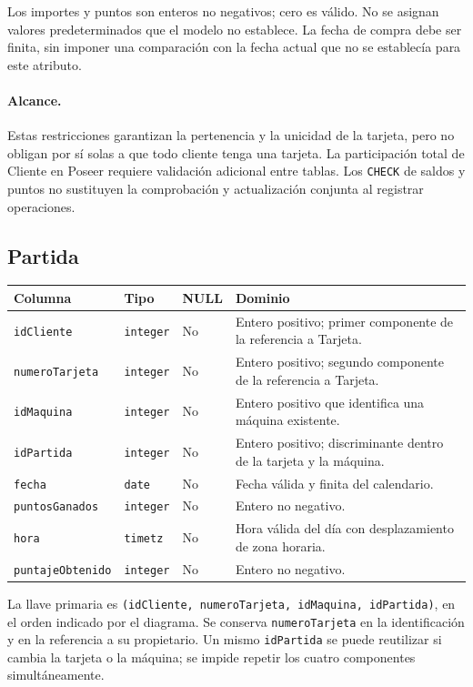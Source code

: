 Los importes y puntos son enteros no negativos; cero es válido. No se
asignan valores predeterminados que el modelo no establece. La fecha
de compra debe ser finita, sin imponer una comparación con la fecha
actual que no se establecía para este atributo.

\paragraph{Alcance.}
Estas restricciones garantizan la pertenencia y la unicidad de la tarjeta,
pero no obligan por sí solas a que todo cliente tenga una tarjeta.
La participación total de Cliente en Poseer requiere validación adicional
entre tablas. Los \texttt{CHECK} de saldos y puntos no sustituyen la
comprobación y actualización conjunta al registrar operaciones.

\clearpage
\subsection{Partida}

\noindent\begin{tabular}{@{}p{}p{}p{}p{}@{}}
\hline
\textbf{Columna} & \textbf{Tipo} & \textbf{NULL} & \textbf{Dominio} \\
\hline
\texttt{idCliente} & \texttt{integer} & No & Entero positivo; primer componente de la referencia a Tarjeta. \\
\texttt{numeroTarjeta} & \texttt{integer} & No & Entero positivo; segundo componente de la referencia a Tarjeta. \\
\texttt{idMaquina} & \texttt{integer} & No & Entero positivo que identifica una máquina existente. \\
\texttt{idPartida} & \texttt{integer} & No & Entero positivo; discriminante dentro de la tarjeta y la máquina. \\
\texttt{fecha} & \texttt{date} & No & Fecha válida y finita del calendario. \\
\texttt{puntosGanados} & \texttt{integer} & No & Entero no negativo. \\
\texttt{hora} & \texttt{timetz} & No & Hora válida del día con desplazamiento de zona horaria. \\
\texttt{puntajeObtenido} & \texttt{integer} & No & Entero no negativo. \\
\hline
\end{tabular}

La llave primaria es
\texttt{(idCliente, numeroTarjeta, idMaquina, idPartida)}, en el orden
indicado por el diagrama. Se conserva \texttt{numeroTarjeta} en la
identificación y en la referencia a su propietario. Un mismo
\texttt{idPartida} se puede reutilizar si cambia la tarjeta o la máquina;
se impide repetir los cuatro componentes simultáneamente.

